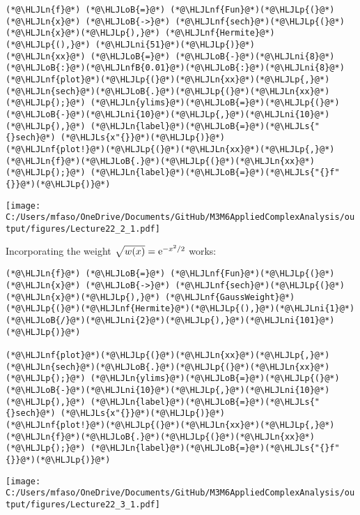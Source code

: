 \documentclass[12pt,a4paper]{article}
\newcommand{\HLJLn}[1]{#1}
\newcommand{\HLJLnf}[1]{\textcolor[RGB]{66,102,213}{#1}}
\newcommand{\HLJLs}[1]{\textcolor[RGB]{201,61,57}{#1}}
\newcommand{\HLJLnfB}[1]{\textcolor[RGB]{59,151,46}{#1}}
\newcommand{\HLJLni}[1]{\textcolor[RGB]{59,151,46}{#1}}
\newcommand{\HLJLoB}[1]{\textcolor[RGB]{102,102,102}{\textbf{#1}}}
\newcommand{\HLJLp}[1]{#1}
\def\E{ {\rm e} }
\begin{document}
\begin{lstlisting}
(*@\HLJLn{f}@*) (*@\HLJLoB{=}@*) (*@\HLJLnf{Fun}@*)(*@\HLJLp{(}@*)(*@\HLJLn{x}@*) (*@\HLJLoB{->}@*) (*@\HLJLnf{sech}@*)(*@\HLJLp{(}@*)(*@\HLJLn{x}@*)(*@\HLJLp{),}@*) (*@\HLJLnf{Hermite}@*)(*@\HLJLp{(),}@*) (*@\HLJLni{51}@*)(*@\HLJLp{)}@*)
(*@\HLJLn{xx}@*) (*@\HLJLoB{=}@*) (*@\HLJLoB{-}@*)(*@\HLJLni{8}@*)(*@\HLJLoB{:}@*)(*@\HLJLnfB{0.01}@*)(*@\HLJLoB{:}@*)(*@\HLJLni{8}@*)
(*@\HLJLnf{plot}@*)(*@\HLJLp{(}@*)(*@\HLJLn{xx}@*)(*@\HLJLp{,}@*) (*@\HLJLn{sech}@*)(*@\HLJLoB{.}@*)(*@\HLJLp{(}@*)(*@\HLJLn{xx}@*)(*@\HLJLp{);}@*) (*@\HLJLn{ylims}@*)(*@\HLJLoB{=}@*)(*@\HLJLp{(}@*)(*@\HLJLoB{-}@*)(*@\HLJLni{10}@*)(*@\HLJLp{,}@*)(*@\HLJLni{10}@*)(*@\HLJLp{),}@*) (*@\HLJLn{label}@*)(*@\HLJLoB{=}@*)(*@\HLJLs{"{}sech}@*) (*@\HLJLs{x"{}}@*)(*@\HLJLp{)}@*)
(*@\HLJLnf{plot!}@*)(*@\HLJLp{(}@*)(*@\HLJLn{xx}@*)(*@\HLJLp{,}@*) (*@\HLJLn{f}@*)(*@\HLJLoB{.}@*)(*@\HLJLp{(}@*)(*@\HLJLn{xx}@*)(*@\HLJLp{);}@*) (*@\HLJLn{label}@*)(*@\HLJLoB{=}@*)(*@\HLJLs{"{}f"{}}@*)(*@\HLJLp{)}@*)
\end{lstlisting}

\texttt{[image: C:/Users/mfaso/OneDrive/Documents/GitHub/M3M6AppliedComplexAnalysis/output/figures/Lecture22\_2\_1.pdf]}

Incorporating the weight $\sqrt{w(x)} = \E^{-x^2/2}$ works:


\begin{lstlisting}
(*@\HLJLn{f}@*) (*@\HLJLoB{=}@*) (*@\HLJLnf{Fun}@*)(*@\HLJLp{(}@*)(*@\HLJLn{x}@*) (*@\HLJLoB{->}@*) (*@\HLJLnf{sech}@*)(*@\HLJLp{(}@*)(*@\HLJLn{x}@*)(*@\HLJLp{),}@*) (*@\HLJLnf{GaussWeight}@*)(*@\HLJLp{(}@*)(*@\HLJLnf{Hermite}@*)(*@\HLJLp{(),}@*)(*@\HLJLni{1}@*)(*@\HLJLoB{/}@*)(*@\HLJLni{2}@*)(*@\HLJLp{),}@*)(*@\HLJLni{101}@*)(*@\HLJLp{)}@*)

(*@\HLJLnf{plot}@*)(*@\HLJLp{(}@*)(*@\HLJLn{xx}@*)(*@\HLJLp{,}@*) (*@\HLJLn{sech}@*)(*@\HLJLoB{.}@*)(*@\HLJLp{(}@*)(*@\HLJLn{xx}@*)(*@\HLJLp{);}@*) (*@\HLJLn{ylims}@*)(*@\HLJLoB{=}@*)(*@\HLJLp{(}@*)(*@\HLJLoB{-}@*)(*@\HLJLni{10}@*)(*@\HLJLp{,}@*)(*@\HLJLni{10}@*)(*@\HLJLp{),}@*) (*@\HLJLn{label}@*)(*@\HLJLoB{=}@*)(*@\HLJLs{"{}sech}@*) (*@\HLJLs{x"{}}@*)(*@\HLJLp{)}@*)
(*@\HLJLnf{plot!}@*)(*@\HLJLp{(}@*)(*@\HLJLn{xx}@*)(*@\HLJLp{,}@*) (*@\HLJLn{f}@*)(*@\HLJLoB{.}@*)(*@\HLJLp{(}@*)(*@\HLJLn{xx}@*)(*@\HLJLp{);}@*) (*@\HLJLn{label}@*)(*@\HLJLoB{=}@*)(*@\HLJLs{"{}f"{}}@*)(*@\HLJLp{)}@*)
\end{lstlisting}

\texttt{[image: C:/Users/mfaso/OneDrive/Documents/GitHub/M3M6AppliedComplexAnalysis/output/figures/Lecture22\_3\_1.pdf]}
\end{document}
